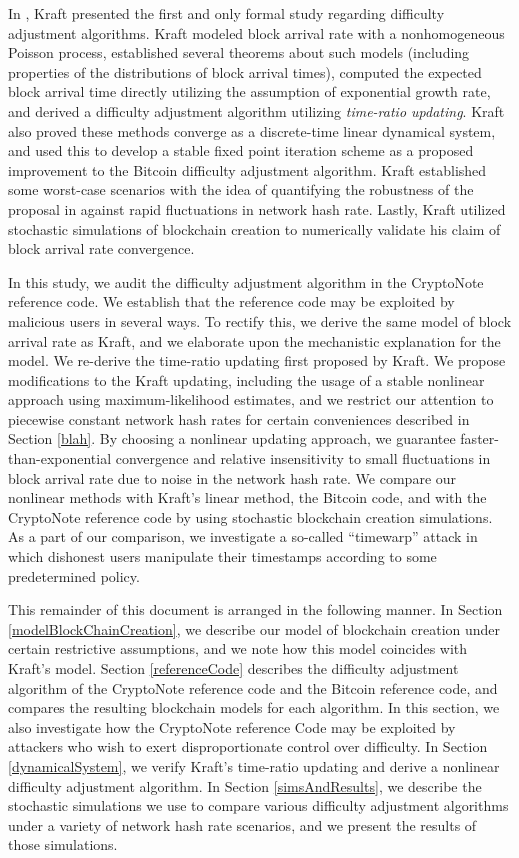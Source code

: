 \documentclass[12pt,english]{mrl}
\theoremstyle{definition}
\numberwithin{equation}{section}
\numberwithin{figure}{section}
\numberwithin{equation}{section}
\numberwithin{equation}{section}
\numberwithin{figure}{section}
\begin{document}
In \cite{kraft2015difficulty}, Kraft presented the first and only formal study regarding difficulty adjustment algorithms. Kraft modeled block arrival rate with a nonhomogeneous Poisson process, established several theorems about such models (including properties of the distributions of block arrival times), computed the expected block arrival time directly utilizing the assumption of exponential growth rate, and derived a difficulty adjustment algorithm utilizing \textit{time-ratio updating}. Kraft also proved these methods converge as a discrete-time linear dynamical system, and used this to develop a stable fixed point iteration scheme as a proposed improvement to the Bitcoin difficulty adjustment algorithm. Kraft established some worst-case scenarios with the idea of quantifying the robustness of the proposal in \cite{kraft2015difficulty} against rapid fluctuations in network hash rate. Lastly, Kraft utilized stochastic simulations of blockchain creation to numerically validate his claim of block arrival rate convergence.

In this study, we audit the difficulty adjustment algorithm in the CryptoNote reference code. We establish that the reference code may be exploited by malicious users in several ways. To rectify this, we derive the same model of block arrival rate as Kraft, and we elaborate upon the mechanistic explanation for the model. We re-derive the time-ratio updating first proposed by Kraft. We propose modifications to the Kraft updating, including the usage of a stable nonlinear approach using maximum-likelihood estimates, and we restrict our attention to piecewise constant network hash rates for certain conveniences described in Section \ref{blah}. By choosing a nonlinear updating approach, we guarantee faster-than-exponential convergence and relative insensitivity to small fluctuations in block arrival rate due to noise in the network hash rate. We compare our nonlinear methods with Kraft's linear method, the Bitcoin code, and with the CryptoNote reference code by using stochastic blockchain creation simulations. As a part of our comparison, we investigate a so-called ``timewarp'' attack in which dishonest users manipulate their timestamps according to some predetermined policy.

This remainder of this document is arranged in the following manner. In Section \ref{modelBlockChainCreation}, we describe our model of blockchain creation under certain restrictive assumptions, and we note how this model coincides with Kraft's model. Section \ref{referenceCode} describes the difficulty adjustment algorithm of the CryptoNote reference code and the Bitcoin reference code, and compares the resulting blockchain models for each algorithm. In this section, we also investigate how the CryptoNote reference Code may be exploited by attackers who wish to exert disproportionate control over difficulty. In Section \ref{dynamicalSystem}, we verify Kraft's time-ratio updating and derive a nonlinear difficulty adjustment algorithm. In Section \ref{simsAndResults}, we describe the stochastic simulations we use to compare various difficulty adjustment algorithms under a variety of network hash rate scenarios, and we present the results of those simulations.
\end{document}

